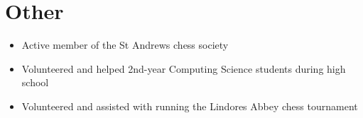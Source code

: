 \documentclass{article}
\begin{document}
	\section*{Other}
		\begin{itemize}
			\item Active member of the St Andrews chess society
			\item Volunteered and helped 2nd-year Computing Science students during high school
			\item Volunteered and assisted with running the Lindores Abbey chess tournament
		\end{itemize}
	
\end{document}
